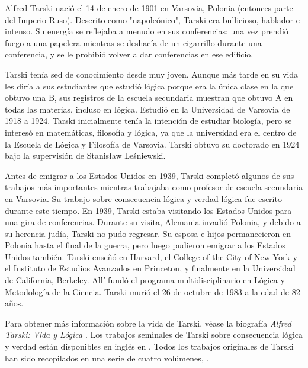 \documentclass[../../../include/open-logic-section]{subfiles}
\begin{document}



Alfred Tarski nació el 14 de enero de 1901 en Varsovia, Polonia (entonces parte del Imperio Ruso). Descrito como "napoleónico", Tarski era bullicioso, hablador e intenso. Su energía se reflejaba a menudo en sus conferencias: una vez prendió fuego a una papelera mientras se deshacía de un cigarrillo durante una conferencia, y se le prohibió volver a dar conferencias en ese edificio.

Tarski tenía sed de conocimiento desde muy joven. Aunque más tarde en su vida les diría a sus estudiantes que estudió lógica porque era la única clase en la que obtuvo una B, sus registros de la escuela secundaria muestran que obtuvo A en todas las materias, incluso en lógica. Estudió en la Universidad de Varsovia de 1918 a 1924. Tarski inicialmente tenía la intención de estudiar biología, pero se interesó en matemáticas, filosofía y lógica, ya que la universidad era el centro de la Escuela de Lógica y Filosofía de Varsovia. Tarski obtuvo su doctorado en 1924 bajo la supervisión de Stanis\l{}aw Le\'{s}niewski.

Antes de emigrar a los Estados Unidos en 1939, Tarski completó algunos de sus trabajos más importantes mientras trabajaba como profesor de escuela secundaria en Varsovia. Su trabajo sobre consecuencia lógica y verdad lógica fue escrito durante este tiempo. En 1939, Tarski estaba visitando los Estados Unidos para una gira de conferencias. Durante su visita, Alemania invadió Polonia, y debido a su herencia judía, Tarski no pudo regresar. Su esposa e hijos permanecieron en Polonia hasta el final de la guerra, pero luego pudieron emigrar a los Estados Unidos también. Tarski enseñó en Harvard, el College of the City of New York y el Instituto de Estudios Avanzados en Princeton, y finalmente en la Universidad de California, Berkeley. Allí fundó el programa multidisciplinario en Lógica y Metodología de la Ciencia. Tarski murió el 26 de octubre de 1983 a la edad de 82 años.

\begin{reading}
Para obtener más información sobre la vida de Tarski, véase la biografía \emph{Alfred Tarski: Vida y Lógica} \citep{Feferman2004}. Los trabajos seminales de Tarski sobre consecuencia lógica y verdad están disponibles en inglés en \citep{Tarski1983}. Todos los trabajos originales de Tarski han sido recopilados en una serie de cuatro volúmenes, \citep{Tarski1981}.
\end{reading}
\end{document}

